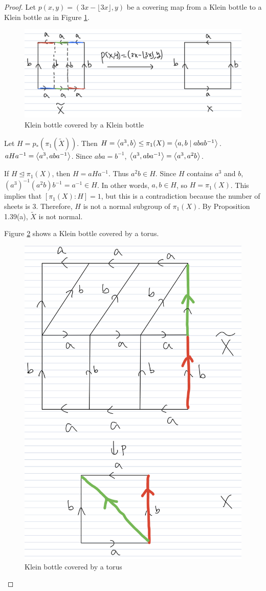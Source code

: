 \documentclass[12pt, psamsfonts]{amsart}
\theoremstyle{definition}
\theoremstyle{remark}
\numberwithin{equation}{section}
\begin{document}
\begin{proof}
  Let $p(x, y) = (3x - \lfloor 3x \rfloor, y)$ be a covering map from a Klein bottle to a Klein bottle as in Figure \ref{fig:problem20_klein_by_klein}.

  \begin{figure}
    \includegraphics[width=.5\linewidth]{problem20_klein_by_klein.jpeg}
    \caption{Klein bottle covered by a Klein bottle}
    \label{fig:problem20_klein_by_klein}
  \end{figure}

  Let $H = p_*(\pi_1(\tilde{X}))$.
  Then $H = \ev{a^3, b} \leq \pi_1(X) = \ev{ a, b \mid abab^{-1} }$.
  $aHa^{-1} = \ev{a^3, aba^{-1}}$.
  Since $aba = b^{-1}$, $\ev{a^3, aba^{-1}} = \ev{a^3, a^2b}$.

  If $H \trianglelefteq \pi_1(X)$, then $H = aHa^{-1}$.
  Thus $a^2b \in H$.
  Since $H$ contains $a^3$ and $b$, $(a^3)^{-1}(a^2b)b^{-1} = a^{-1} \in H$.
  In other words, $a, b \in H$, so $H = \pi_1(X)$.
  This implies that $[\pi_1(X):H] = 1$, but this is a contradiction because the number of sheets is 3.
  Therefore, $H$ is not a normal subgroup of $\pi_1(X)$.
  By Proposition 1.39(a), $\tilde{X}$ is not normal.

  Figure \ref{fig:problem20_klein_by_torus} shows a Klein bottle covered by a torus.

  \begin{figure}
    \includegraphics[width=.5\linewidth]{problem20_klein_by_torus.jpeg}
    \caption{Klein bottle covered by a torus}
    \label{fig:problem20_klein_by_torus}
  \end{figure}


\end{proof}
\end{document}
